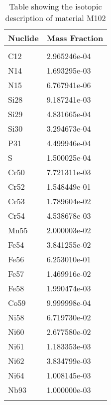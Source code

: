 \begin{centering}
\begin{longtable}[ht!]
\caption{Table showing the isotopic description of material Lenses}
\label{table:material_Lenses}
\end{longtable}\clearpage

\begin{longtable}[ht!]
{ p{} | p{} }
\hline
Nuclide & Mass Fraction\\
\hline
\\
C12 & 2.965246e-04\\
N14 & 1.693295e-03\\
N15 & 6.767941e-06\\
Si28 & 9.187241e-03\\
Si29 & 4.831665e-04\\
Si30 & 3.294673e-04\\
P31 & 4.499946e-04\\
S & 1.500025e-04\\
Cr50 & 7.721311e-03\\
Cr52 & 1.548449e-01\\
Cr53 & 1.789604e-02\\
Cr54 & 4.538678e-03\\
Mn55 & 2.000003e-02\\
Fe54 & 3.841255e-02\\
Fe56 & 6.253010e-01\\
Fe57 & 1.469916e-02\\
Fe58 & 1.990474e-03\\
Co59 & 9.999998e-04\\
Ni58 & 6.719730e-02\\
Ni60 & 2.677580e-02\\
Ni61 & 1.183353e-03\\
Ni62 & 3.834799e-03\\
Ni64 & 1.008145e-03\\
Nb93 & 1.000000e-03\\

\caption{Table showing the isotopic description of material M102}
\label{table:material_M102}
\end{longtable}\clearpage


\end{centering}
